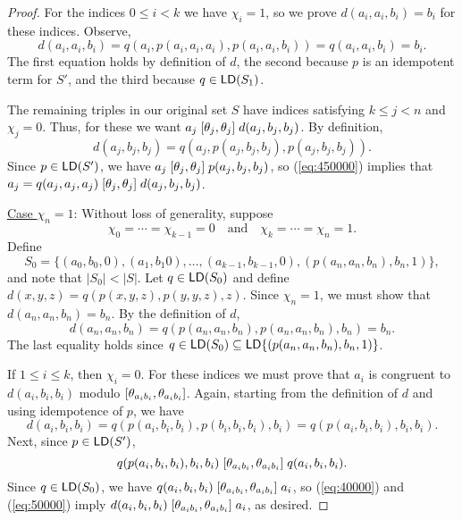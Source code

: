 \begin{proof}
For the indices $0\leq i < k$ we have $\chi_i =1$, so we prove
$d(a_i,a_i,b_i) = b_i$ for these indices. Observe,
\[
  d(a_i,a_i,b_i) =
  q(a_i, p(a_i,a_i,a_i), p(a_i,a_i,b_i)) %
  =q(a_i, a_i, b_i) %
  =b_i. %
\]
The first equation holds by definition of $d$, the second
because $p$ is an idempotent \ld term for
$S'$, and the third because $q \in \mathsf{LD}(S_1)$.

The remaining triples in our original set $S$
have indices satisfying $k\leq j < n$ and $\chi_j = 0$.
Thus, for these we want
$a_j \mathrel{[\theta_j, \theta_j]} d(a_j,b_j,b_j)$.
By definition,
\begin{equation}
  \label{eq:450000}
d(a_j,b_j,b_j) =q(a_j, p(a_j,b_j,b_j), p(a_j,b_j,b_j)).
\end{equation}
Since $p \in \mathsf{LD}(S')$, we have
$a_j \mathrel{[\theta_j, \theta_j]} p(a_j,b_j,b_j)$, 
so (\ref{eq:450000}) implies that
$a_j = q(a_j,a_j,a_j) \mathrel{[\theta_j, \theta_j]} d(a_j, b_j,b_j)$.


\medskip
\noindent \underline{Case $\chi_n = 1$}:
Without loss of generality, suppose 
\begin{equation*}
  \chi_0 =\cdots =\chi_{k-1} = 0 
  \quad \text{and} \quad
\chi_{k} = \cdots = \chi_{n} = 1.
\end{equation*}
Define
\begin{equation*}
S_0 = \{(a_0, b_0, 0), (a_1, b_1 0), \dots, (a_{k-1}, b_{k-1}, 0), 
        (p(a_n, a_n, b_n), b_n, 1)\},
\end{equation*}
and note that $|S_0| < |S|$.
Let $q \in \mathsf{LD}(S_0)$ and define
$d(x,y,z) = q(p(x,y,z), p(y,y,z), z)$.
Since $\chi_n =1$, we must show that
$d(a_n,a_n,b_n) = b_n$. By the definition of $d$,
\begin{equation*}  
  d(a_n,a_n,b_n) =
  q(p(a_n,a_n,b_n), p(a_n,a_n,b_n), b_n) =b_n.
\end{equation*}
The last equality holds since $q \in \mathsf{LD}(S_0)\subseteq \mathsf{LD}\{(p(a_n, a_n, b_n), b_n, 1)\}$.

If $1\leq i \leq k$, then $\chi_i =0$. For these indices we must prove
that $a_i$ is congruent to $d(a_i,b_i,b_i)$ modulo $[\theta_{a_ib_i}, \theta_{a_ib_i}]$.
Again, starting from the definition of $d$ and using idempotence of $p$, we have
\begin{equation}
  \label{eq:40000}
  d(a_i,b_i,b_i) =
  q(p(a_i,b_i,b_i), p(b_i,b_i,b_i), b_i)=
  q(p(a_i,b_i,b_i), b_i, b_i).
\end{equation}
Next, since $p \in \mathsf{LD}(S')$,
\begin{equation}
  \label{eq:50000}
  q(p(a_i,b_i,b_i), b_i, b_i)
 \mathrel{[\theta_{a_ib_i}, \theta_{a_ib_i}]}
 q(a_i, b_i, b_i).
\end{equation}
Since $q \in \mathsf{LD}(S_0)$, we have
$q(a_i, b_i, b_i) \mathrel{[\theta_{a_ib_i}, \theta_{a_ib_i}]} a_i$, so 
(\ref{eq:40000}) and (\ref{eq:50000}) imply
$d(a_i,b_i,b_i) \mathrel{[\theta_{a_ib_i}, \theta_{a_ib_i}]} a_i$, as desired.


\end{proof}
